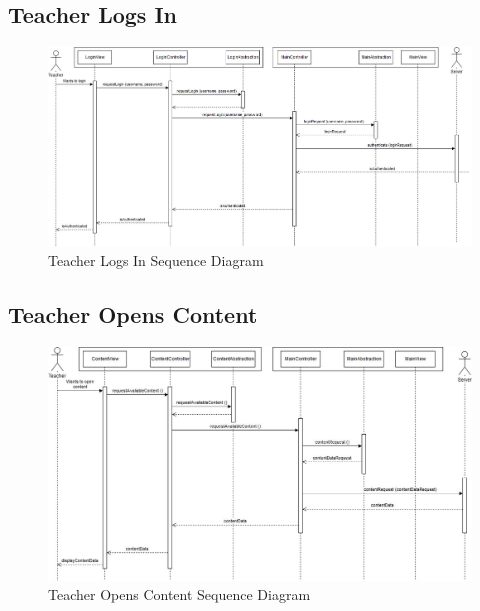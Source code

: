 \documentclass[]{article}
\begin{document}
\subsection{Teacher Logs In}
{
\begin{figure}[H]
  \centering
  \includegraphics[scale=0.3]{A3_Assets/TeacherLogsIn.jpg}
  \caption{Teacher Logs In Sequence Diagram}
\end{figure}
}

\subsection{Teacher Opens Content}
{
\begin{figure}[H]
  \centering
  \includegraphics[scale=0.3]{A3_Assets/TeacherOpensContent.jpg}
  \caption{Teacher Opens Content Sequence Diagram}
\end{figure}
}
\end{document}
